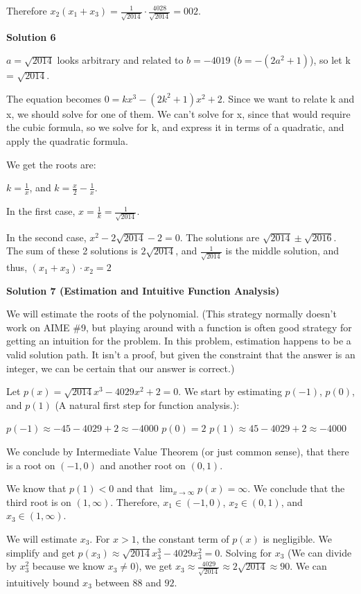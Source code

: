 \begin{enumerate}
 Therefore $x_{2}(x_{1}+x_{3}) =\frac{1}{\sqrt{2014}} \cdot\frac{4028}{\sqrt{2014}} = \boxed{002}.$




\textbf{Solution 6}

$a=\sqrt{2014}$ looks arbitrary and related to $b=-4019$ ($b=-(2a^2+1)$), so let k = $\sqrt{2014}$.

 The equation becomes $0 = kx^3 - (2k^2 + 1)x^2 + 2$. Since we want to relate k and x, we should solve for one of them. We can't solve for x, since that would require the cubic formula, so we solve for k, and express it in terms of a quadratic, and apply the quadratic formula.

 We get the roots are:

 $k = \frac{1}{x}$, and $k = \frac{x}{2} - \frac{1}{x}$.

 In the first case, $x = \frac{1}{k} = \frac{1}{\sqrt{2014}}$.

 In the second case, $x^2 - 2\sqrt{2014} - 2 = 0$. The solutions are $\sqrt{2014} \pm \sqrt{2016}$. The sum of these 2 solutions is $2 \sqrt{2014}$, and $\frac{1}{\sqrt{2014}}$ is the middle solution, and thus, $(x_1 + x_3) \cdot x_2 = 2$




\textbf{Solution 7 (Estimation and Intuitive Function Analysis)}

We will estimate the roots of the polynomial. (This strategy normally doesn't work on AIME \#9, but playing around with a function is often good strategy for getting an intuition for the problem. In this problem, estimation happens to be a valid solution path. It isn't a proof, but given the constraint that the answer is an integer, we can be certain that our answer is correct.)

 
Let $p(x) = \sqrt{2014}x^3-4029x^2+2=0$. We start by estimating $p(-1)$, $p(0)$, and $p(1)$ (A natural first step for function analysis.):

 
$p(-1)\approx -45-4029+2 \approx -4000$
$p(0) = 2$
$p(1) \approx 45-4029+2 \approx -4000$

 
We conclude by Intermediate Value Theorem (or just common sense), that there is a root on $(-1, 0)$ and another root on $(0, 1)$.

 
We know that $p(1) < 0$ and that $\lim_{x\to\infty} p(x) = \infty$. We conclude that the third root is on $(1, \infty)$. Therefore, $x_1 \in (-1, 0)$, $x_2 \in (0, 1)$, and $x_3 \in (1, \infty)$.

 
We will estimate $x_3$. For $x > 1$, the constant term of $p(x)$ is negligible. We simplify and get $p(x_3) \approx \sqrt{2014}x_{3}^3 - 4029x_{3}^2 = 0$. Solving for $x_3$ (We can divide by $x_{3}^2$ because we know $x_3 \neq 0$), we get $x_3 \approx \frac{4029}{\sqrt{2014}} \approx 2\sqrt{2014} \approx 90$. We can intuitively bound $x_3$ between $88$ and $92$.


\end{enumerate}
